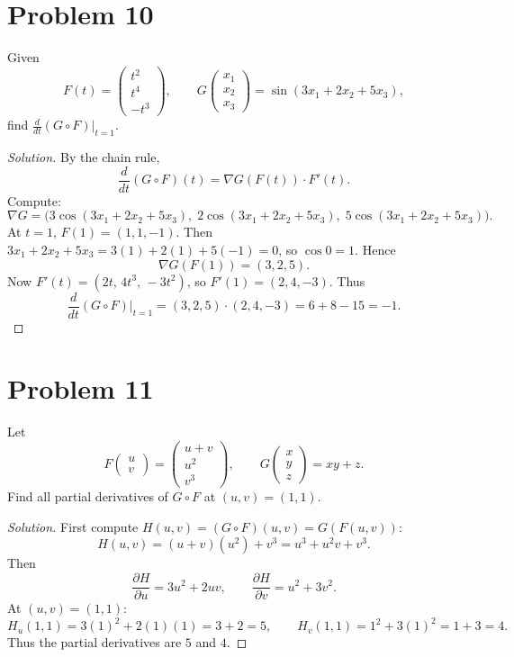\documentclass{article}
\begin{document}
\section*{Problem 10}
Given
\[
	F(t)=\begin{pmatrix} t^2 \\ t^4 \\ -t^3 \end{pmatrix},\qquad
	G\begin{pmatrix}x_1\\x_2\\x_3\end{pmatrix}=\sin(3x_1+2x_2+5x_3),
\]
find \(\displaystyle\frac{d}{dt}(G\circ F)\Big|_{t=1}\).

\begin{proof}[Solution]
	By the chain rule,
	\[
		\frac{d}{dt}(G\circ F)(t)=\nabla G(F(t))\cdot F'(t).
	\]
	Compute:
	\[
		\nabla G=\bigl(3\cos(3x_1+2x_2+5x_3),\;2\cos(3x_1+2x_2+5x_3),\;5\cos(3x_1+2x_2+5x_3)\bigr).
	\]
	At \(t=1\), \(F(1)=(1,1,-1)\). Then \(3x_1+2x_2+5x_3=3(1)+2(1)+5(-1)=0\), so \(\cos0=1\). Hence
	\[
		\nabla G(F(1))=(3,2,5).
	\]
	Now \(F'(t)=(2t,\,4t^3,\,-3t^2)\), so \(F'(1)=(2,4,-3)\).
	Thus
	\[
		\frac{d}{dt}(G\circ F)\big|_{t=1}=(3,2,5)\cdot(2,4,-3)=6+8-15=-1.
	\]
\end{proof}

\section*{Problem 11}
Let
\[
	F\begin{pmatrix}u\\v\end{pmatrix}=\begin{pmatrix}u+v\\u^2\\v^3\end{pmatrix},\qquad
	G\begin{pmatrix}x\\y\\z\end{pmatrix}=xy+z.
\]
Find all partial derivatives of \(G\circ F\) at \((u,v)=(1,1)\).

\begin{proof}[Solution]
	First compute \(H(u,v)=(G\circ F)(u,v)=G(F(u,v))\):
	\[
		H(u,v)=(u+v)(u^2)+v^3=u^3+u^2v+v^3.
	\]
	Then
	\[
		\frac{\partial H}{\partial u}=3u^2+2uv,\qquad
		\frac{\partial H}{\partial v}=u^2+3v^2.
	\]
	At \((u,v)=(1,1)\):
	\[
		H_u(1,1)=3(1)^2+2(1)(1)=3+2=5,\qquad
		H_v(1,1)=1^2+3(1)^2=1+3=4.
	\]
	Thus the partial derivatives are \(5\) and \(4\).
\end{proof}
\end{document}

